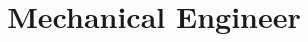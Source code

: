 \documentclass[11pt,a4paper,sans]{moderncv}
\title{Mechanical Engineer}
\begin{document}
\makecvtitle





\end{document}
